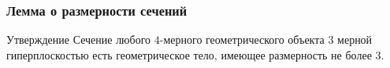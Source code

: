 \documentclass[10pt,pdf,hyperref={unicode}]{beamer}
\begin{document}
\begin{frame}
	\frametitle{Лемма о размерности сечений}

{\small
	\begin{block}{Утверждение}
		Сечение любого $4$-мерного геометрического объекта $3$ мерной гиперплоскостью есть геометрическое тело, имеющее размерность не более $3$. 
	\end{block}
}
	\begin{columns}

\end{columns}
\end{frame}
\end{document}
